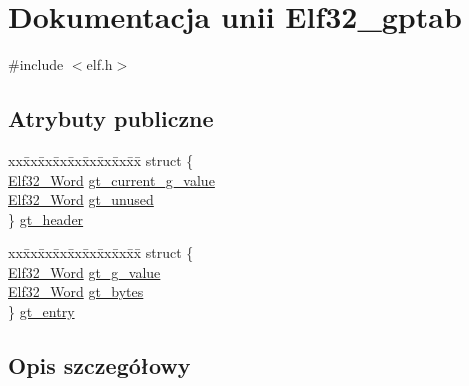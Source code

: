 \hypertarget{union_elf32__gptab}{\section{Dokumentacja unii Elf32\-\_\-gptab}
\label{union_elf32__gptab}
}


{\ttfamily \#include $<$elf.\-h$>$}

\subsection*{Atrybuty publiczne}
\begin{DoxyCompactItemize}
\item 
\begin{tabbing}
xx\=xx\=xx\=xx\=xx\=xx\=xx\=xx\=xx\=\kill
struct \{\\
\>\hyperlink{elf_8h_af5924ece606c732e86f8263a19408e45}{Elf32\_Word} \hyperlink{union_elf32__gptab_a89ae523fa83704dc11651942f14b23f3}{gt\_current\_g\_value}\\
\>\hyperlink{elf_8h_af5924ece606c732e86f8263a19408e45}{Elf32\_Word} \hyperlink{union_elf32__gptab_aefa9e4dcc4bff4e59999b01f0bc790bf}{gt\_unused}\\
\} \hyperlink{union_elf32__gptab_a441c6711b23ee48ff59b9e42287d146b}{gt\_header}\\

\end{tabbing}\item 
\begin{tabbing}
xx\=xx\=xx\=xx\=xx\=xx\=xx\=xx\=xx\=\kill
struct \{\\
\>\hyperlink{elf_8h_af5924ece606c732e86f8263a19408e45}{Elf32\_Word} \hyperlink{union_elf32__gptab_a5c6035560c772d9b020e5110dbb435b8}{gt\_g\_value}\\
\>\hyperlink{elf_8h_af5924ece606c732e86f8263a19408e45}{Elf32\_Word} \hyperlink{union_elf32__gptab_a1af9c483170a1b9e966d4c728934c7e0}{gt\_bytes}\\
\} \hyperlink{union_elf32__gptab_af0c0a5a25eff0b2129de1589a3eb6841}{gt\_entry}\\

\end{tabbing}\end{DoxyCompactItemize}


\subsection{Opis szczegółowy}


